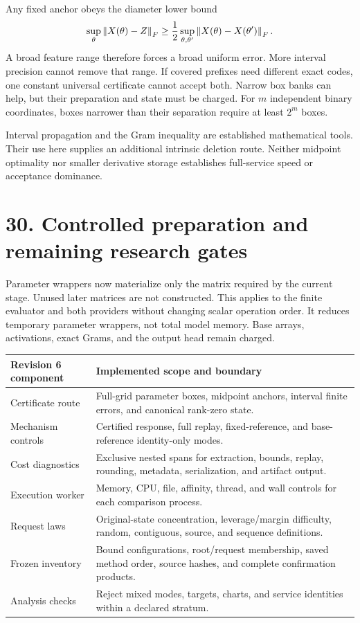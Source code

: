 Any fixed anchor obeys the diameter lower bound
\[
 \sup_\theta\left\|X(\theta)-Z\right\|_F
 \ge\frac12\sup_{\theta,\theta'}\left\|X(\theta)-X(\theta')\right\|_F.
\]
A broad feature range therefore forces a broad uniform error.
More interval precision cannot remove that range.
If covered prefixes need different exact codes, one constant universal certificate cannot accept both.
Narrow box banks can help, but their preparation and state must be charged.
For $m$ independent binary coordinates, boxes narrower than their separation require at least $2^m$ boxes.

Interval propagation and the Gram inequality are established mathematical tools.
Their use here supplies an additional intrinsic deletion route.
Neither midpoint optimality nor smaller derivative storage establishes full-service speed or acceptance dominance.

\newpage
\section*{30. Controlled preparation and remaining research gates}
Parameter wrappers now materialize only the matrix required by the current stage.
Unused later matrices are not constructed.
This applies to the finite evaluator and both providers without changing scalar operation order.
It reduces temporary parameter wrappers, not total model memory.
Base arrays, activations, exact Grams, and the output head remain charged.

\begin{tabularx}{\linewidth}{@{}p{.28\linewidth}X@{}}\toprule
Revision 6 component & Implemented scope and boundary\\\midrule
Certificate route & Full-grid parameter boxes, midpoint anchors, interval finite errors, and canonical rank-zero state.\\
Mechanism controls & Certified response, full replay, fixed-reference, and base-reference identity-only modes.\\
Cost diagnostics & Exclusive nested spans for extraction, bounds, replay, rounding, metadata, serialization, and artifact output.\\
Execution worker & Memory, CPU, file, affinity, thread, and wall controls for each comparison process.\\
Request laws & Original-state concentration, leverage/margin difficulty, random, contiguous, source, and sequence definitions.\\
Frozen inventory & Bound configurations, root/request membership, saved method order, source hashes, and complete confirmation products.\\
Analysis checks & Reject mixed modes, targets, charts, and service identities within a declared stratum.\\\bottomrule
\end{tabularx}

